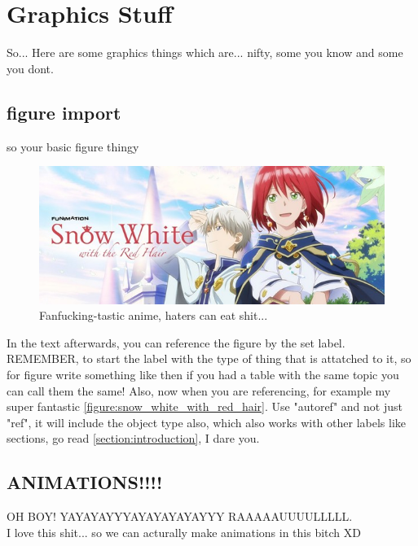 \clearpage
\section{Graphics Stuff}
So... Here are some graphics things which are... nifty, some you know and some you dont.

\subsection{figure import}
so your basic figure thingy
\begin{figure}[H]
	\includegraphics[scale=1]{img/swrh.jpg}
	\centering
	\caption{Fanfucking-tastic anime, haters can eat shit...}
	\label{figure:snow_white_with_red_hair}
\end{figure}
In the text afterwards, you can reference the figure by the set label. REMEMBER, to start the label with the type of thing that
is attatched to it, so for figure write something like  then if you had a table
with the same topic you can call them the same! Also, now when you are referencing, for example my super fantastic
\autoref{figure:snow_white_with_red_hair}. Use "autoref" and not just "ref", it will include the object type also, which also works with
other labels like sections, go read \autoref{section:introduction}, I dare you.

\subsection{ANIMATIONS!!!!}
OH BOY! YAYAYAYYYAYAYAYAYAYYY RAAAAAUUUULLLLL.\\
I love this shit... so we can acturally make animations in this bitch XD

